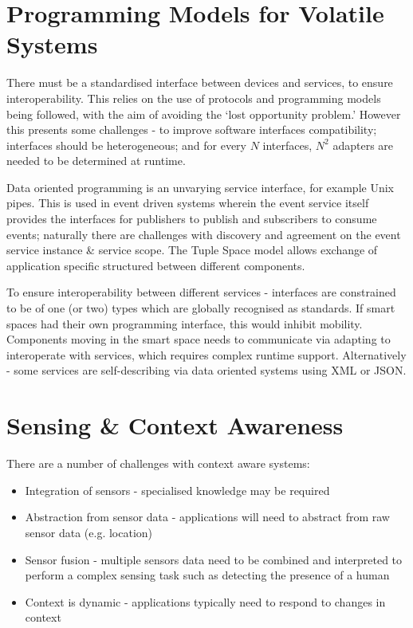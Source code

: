 \section{Programming Models for Volatile Systems}
There must be a standardised interface between devices and services, to ensure interoperability. This relies on the use of protocols and programming models being followed, with the aim of avoiding the `lost opportunity problem.' However this presents some challenges - to improve software interfaces compatibility; interfaces should be heterogeneous; and for every $N$ interfaces, $N^2$ adapters are needed to be determined at runtime. 

Data oriented programming is an unvarying service interface, for example Unix pipes. This is used in event driven systems wherein the event service itself provides the interfaces for publishers to publish and subscribers to consume events; naturally there are challenges with discovery and agreement on the event service instance \& service scope. The Tuple Space model allows exchange of application specific structured between different components. 

To ensure interoperability between different services - interfaces are constrained to be of one (or two) types which are globally recognised as standards. If smart spaces had their own programming interface, this would inhibit mobility. Components moving in the smart space needs to communicate via adapting to interoperate with services, which requires complex runtime support. Alternatively - some services are self-describing via data oriented systems using XML or JSON. 

\section{Sensing \& Context Awareness}
There are a number of challenges with context aware systems:
\begin{itemize}
    \item Integration of sensors - specialised knowledge may be required
    \item Abstraction from sensor data - applications will need to abstract from raw sensor data (e.g. location)
    \item Sensor fusion - multiple sensors data need to be combined and interpreted to perform a complex sensing task such as detecting the presence of a human
    \item Context is dynamic - applications typically need to respond to changes in context
\end{itemize}

